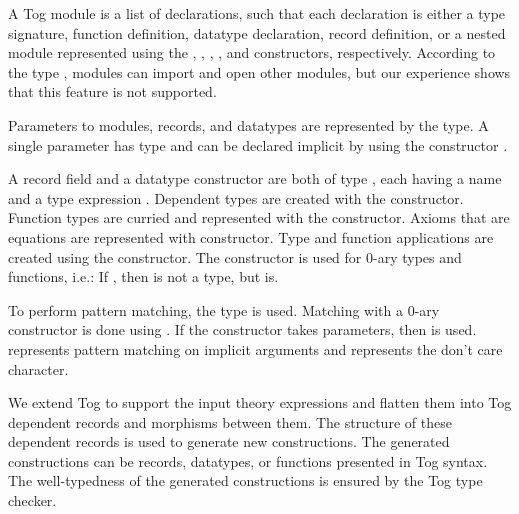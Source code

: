 A Tog module is a list of declarations, such that each declaration is either a type signature, function definition, datatype declaration, record definition, or a nested module represented using the  , , , , and  constructors, respectively. 
According to the type , modules can import and open other modules, but our experience shows that this feature is not supported. 

Parameters to modules, records, and datatypes are represented by the  type. A single parameter has type  and can be declared implicit by using the constructor . 

A record field and a datatype constructor are both of type , each having a name and a type expression . Dependent types are created with the  constructor. Function types are curried and represented with the  constructor. Axioms that are equations are represented with  constructor. Type and function applications are created using the  constructor. The  constructor is used for $0$-ary types and functions, i.e.: If , then  is not a type, but  is.

To perform pattern matching, the  type is used. Matching with a $0$-ary constructor is done using . If the constructor takes parameters, then  is used.  represents pattern matching on implicit arguments and  represents the don't care \lstmath{$\_$} character. 

We extend Tog to support the input theory expressions and flatten them into Tog dependent records and morphisms between them. 
The structure of these dependent records is used to generate new constructions. The generated constructions can be records, datatypes, or functions presented in Tog syntax. The well-typedness of the generated constructions is ensured by the Tog type checker. 


